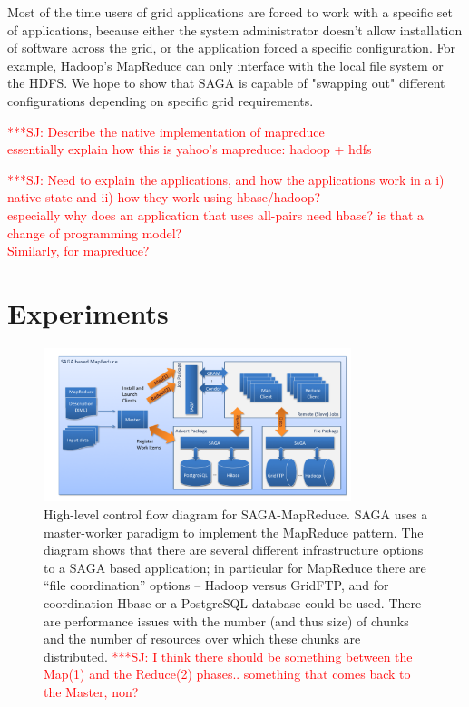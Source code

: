 \documentclass{rspublic}
\newcommand{\jhanote}[1]{ {\textcolor{red} { ***SJ: #1 }}}
\newcommand{\jhanote}[1]{}
\begin{document}
Most of the time users of grid applications are forced to work with a
specific set of applications, because either the system administrator
doesn't allow installation of software across the grid, or the
application forced a specific configuration.  For example, Hadoop's
MapReduce can only interface with the local file system or the HDFS.
We hope to show that SAGA is capable of "swapping out" different
configurations depending on specific grid requirements.

\jhanote{Describe the native implementation of mapreduce\\
  essentially explain how this is yahoo's mapreduce: hadoop + hdfs}

\jhanote{Need to explain the applications, and how the applications
  work in a i) native state and ii) how they work using hbase/hadoop? \\
  especially why does an application that uses all-pairs need hbase?
  is that a change of programming model?  \\ Similarly, for
  mapreduce?}


\section*{Experiments}


\begin{figure}[t]
      \centering
          \includegraphics[width=0.8\textwidth]{saga-mapreduce_controlflow.png}
          \caption{High-level control flow diagram for
            SAGA-MapReduce. SAGA uses a master-worker paradigm to
            implement the MapReduce pattern. The diagram shows that
            there are several different infrastructure options to a
            SAGA based application; in particular for MapReduce there
            are ``file coordination'' options -- Hadoop versus
            GridFTP, and for coordination Hbase or a PostgreSQL
            database could be used. There are performance issues with
            the number (and thus size) of chunks and the number of
            resources over which these chunks are distributed.
            \jhanote{I think there should be something between the
              Map(1) and the Reduce(2) phases.. something that comes
              back to the Master, non?}}
      \label{saga-mapreduce_controlflow.png}
\end{figure}
\end{document}
